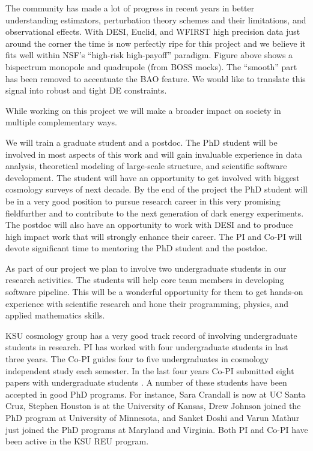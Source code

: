 The community has made a lot of progress in recent years in better
understanding estimators, perturbation theory schemes and their limitations,
and observational effects. With DESI, Euclid, and WFIRST high precision data
just around the corner the time is now perfectly ripe for this project and we
believe it fits well within NSF's ``high-risk high-payoff'' paradigm. Figure
above shows a bispectrum monopole and quadrupole (from BOSS mocks). The
``smooth'' part has been removed to accentuate the BAO feature. We would like
to translate this signal into robust and tight DE constraints.


While working on this project we will make a broader impact on society in
multiple complementary ways.

We will train a graduate student and a postdoc. The PhD student will be
involved in most aspects of this work and will gain invaluable experience in
data analysis, theoretical modeling of large-scale structure, and scientific
software development. The student will have an opportunity to get involved with
biggest cosmology surveys of next decade. By the end of the project the PhD
student will be in a very good position to pursue research career in this
very promising fieldfurther and to contribute to the next generation of dark
energy experiments. The postdoc will also have an opportunity to work with DESI
and to produce high impact work that will strongly enhance their career. The
PI and Co-PI will devote significant time to mentoring the PhD student and
the postdoc.

As part of our project we plan to involve two undergraduate students in our
research activities. The students will help core team members in developing
software pipeline. This will be a wonderful opportunity for them to get
hands-on experience with scientific research and hone their programming,
physics, and applied mathematics skills. 

KSU cosmology group has a very good track record of involving undergraduate
students in research. PI has worked with four undergraduate students in last
three years. The Co-PI guides four to five undergraduates in cosmology
independent study each semester. In the last four years Co-PI submitted eight
papers with undergraduate students \cite{2015MPLA...3050123C,2016ApJ...829...61C,2017ApJ...835...26F,2017ApJ...835...86C,2018arXiv180205571O,2018PASP..130b4101C,2018arXiv180501917C,2018MNRAS.479.4566M,2018PASP..130k4001P}. A number of these students have been
accepted in good PhD programs. For instance, Sara Crandall is now at UC Santa
Cruz, Stephen Houston is at the University of Kansas, Drew Johnson joined the
PhD program at University of Minnesota, and Sanket Doshi and Varun Mathur just
joined the PhD programs at Maryland and Virginia. Both PI and Co-PI have been
active in the KSU REU program.

